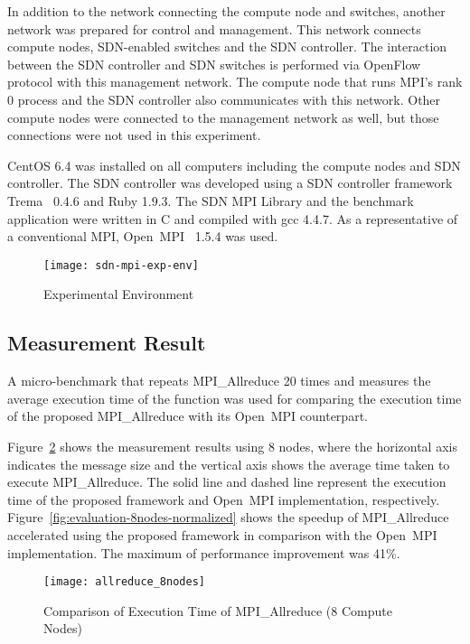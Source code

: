 In addition to the network connecting the compute node and switches,
another network was prepared for control and management. This network
connects compute nodes, SDN-enabled switches and the SDN controller.
The interaction between the SDN controller and SDN switches is performed
via OpenFlow protocol with this management network. The compute node
that runs MPI's rank 0 process and the SDN controller also communicates
with this network. Other compute nodes were connected to the
management network as well, but those connections were not used in this
experiment.

CentOS 6.4 was installed on all computers including the compute nodes and
SDN controller. The SDN controller was developed using a SDN controller
framework Trema~\autocite{trema} 0.4.6 and Ruby 1.9.3. The SDN
MPI Library and the benchmark application were written in C and
compiled with gcc 4.4.7. As a representative of a conventional MPI,
Open~MPI~\autocite{Gabriel2004} 1.5.4 was used.

\begin{figure}
    \centering
    \texttt{[image: sdn-mpi-exp-env]}
    \caption{Experimental Environment}%
    \label{fig:experiment-environment}
\end{figure}

\subsection{Measurement Result}

A micro-benchmark that repeats MPI\_Allreduce 20
times and measures the average execution time of the function was used
for comparing the execution time of the proposed MPI\_Allreduce
with its Open~MPI counterpart.

Figure~\ref{fig:evaluation-8nodes} shows the measurement results using 8
nodes, where the horizontal axis indicates the message size and the
vertical axis shows the average time taken to execute
MPI\_Allreduce. The solid line and dashed line represent the
execution time of the proposed framework and Open~MPI implementation,
respectively. Figure~\ref{fig:evaluation-8nodes-normalized} shows the speedup
of MPI\_Allreduce accelerated using the proposed framework in comparison with
the Open~MPI implementation. The maximum of performance improvement was 41\%.

\begin{figure}
    \centering
    \texttt{[image: allreduce\_8nodes]}
    \caption{Comparison of Execution Time of MPI\_Allreduce (8 Compute Nodes)}%
    \label{fig:evaluation-8nodes}
\end{figure}

